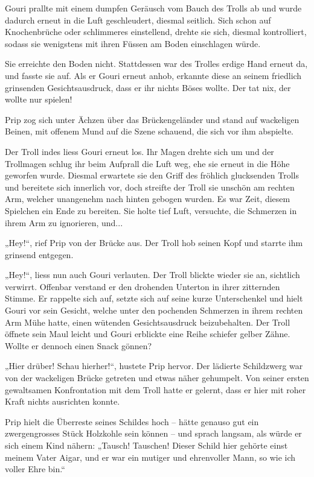 Gouri prallte mit einem dumpfen Geräusch vom Bauch des Trolls ab und wurde dadurch erneut in die Luft geschleudert, diesmal seitlich. Sich schon auf Knochenbrüche oder schlimmeres einstellend, drehte sie sich, diesmal kontrolliert, sodass sie wenigstens mit ihren Füssen am Boden einschlagen würde.

Sie erreichte den Boden nicht. Stattdessen war des Trolles erdige Hand erneut da, und fasste sie auf. Als er Gouri erneut anhob, erkannte diese an seinem friedlich grinsenden Gesichtsausdruck, dass er ihr nichts Böses wollte. Der tat nix, der wollte nur spielen!

Prip zog sich unter Ächzen über das Brückengeländer und stand auf wackeligen Beinen, mit offenem Mund auf die Szene schauend, die sich vor ihm abspielte.

Der Troll indes liess Gouri erneut los. Ihr Magen drehte sich um und der Trollmagen schlug ihr beim Aufprall die Luft weg, ehe sie erneut in die Höhe geworfen wurde. Diesmal erwartete sie den Griff des fröhlich glucksenden Trolls und bereitete sich innerlich vor, doch streifte der Troll sie unschön am rechten Arm, welcher unangenehm nach hinten gebogen wurden. Es war Zeit, diesem Spielchen ein Ende zu bereiten. Sie holte tief Luft, versuchte, die Schmerzen in ihrem Arm zu ignorieren, und...

„Hey!“, rief Prip von der Brücke aus. Der Troll hob seinen Kopf und starrte ihm grinsend entgegen.

„Hey!“, liess nun auch Gouri verlauten. Der Troll blickte wieder sie an, sichtlich verwirrt. Offenbar verstand er den drohenden Unterton in ihrer zitternden Stimme. Er rappelte sich auf, setzte sich auf seine kurze Unterschenkel und hielt Gouri vor sein Gesicht, welche unter den pochenden Schmerzen in ihrem rechten Arm Mühe hatte, einen wütenden Gesichtsausdruck beizubehalten. Der Troll öffnete sein Maul leicht und Gouri erblickte eine Reihe schiefer gelber Zähne. Wollte er dennoch einen Snack gönnen?

„Hier drüber! Schau hierher!“, hustete Prip hervor. Der lädierte Schildzwerg war von der wackeligen Brücke getreten und etwas näher gehumpelt. Von seiner ersten gewaltsamen Konfrontation mit dem Troll hatte er gelernt, dass er hier mit roher Kraft nichts ausrichten konnte.

Prip hielt die Überreste seines Schildes hoch – hätte genauso gut ein zwergengrosses Stück Holzkohle sein können – und sprach langsam, als würde er sich einem Kind nähern: „Tausch! Tauschen! Dieser Schild hier gehörte einst meinem Vater Aigar, und er war ein mutiger und ehrenvoller Mann, so wie ich voller Ehre bin.“

